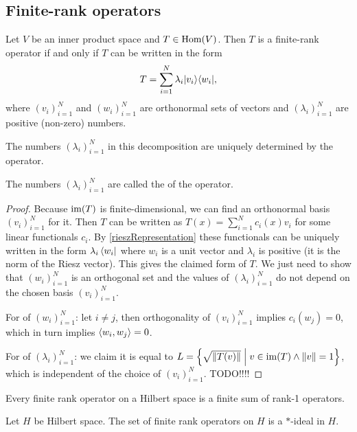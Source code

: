 \subsection{Finite-rank operators}
\begin{proposition} \label{finiteRankSingularValues}
Let $V$ be an inner product space and $T\in\operatorname{Hom}(V)$. Then $T$ is a finite-rank operator \textup{if and only if} $T$ can be written in the form
\[ T = \sum_{i=1}^N \lambda_i |v_i\rangle\langle w_i|, \]
where $(v_i)_{i=1}^N$ and $(w_i)_{i=1}^N$ are orthonormal sets of vectors and $(\lambda_i)_{i=1}^N$ are positive (non-zero) numbers.

The numbers $(\lambda_i)_{i=1}^N$ in this decomposition are uniquely determined by the operator.
\end{proposition}
The numbers $(\lambda_i)_{i=1}^N$ are called the  of the operator.
\begin{proof}
Because $\operatorname{im}(T)$ is finite-dimensional, we can find an orthonormal basis $(v_i)_{i=1}^N$ for it. Then $T$ can be written as $T(x) = \sum_{i=1}^N c_i(x)v_i$ for some linear functionals $c_i$. By \ref{rieszRepresentation} these functionals can be uniquely written in the form $\lambda_i\left\langle w_i \right|$ where $w_i$ is a unit vector and $\lambda_i$ is positive (it is the norm of the Riesz vector). This gives the claimed form of $T$. We just need to show that $(w_i)_{i=1}^N$ is an orthogonal set and the values of $(\lambda_i)_{i=1}^N$ do not depend on the chosen basis $(v_i)_{i=1}^N$.

For  of $(w_i)_{i=1}^N$: let $i\neq j$, then orthogonality of $(v_i)_{i=1}^N$ implies $c_i(w_j) = 0$, which in turn implies $\left\langle w_i,w_j \right\rangle = 0$.

For  of $(\lambda_i)_{i=1}^N$: we claim it is equal to $L = \left\{ \sqrt{\lVert T(v)\rVert} \;\middle|\; v\in\operatorname{im}(T)\land\lVert v\rVert=1 \right\}$, which is independent of the choice of $(v_i)_{i=1}^N$. TODO!!!!
\end{proof}
\begin{corollary}
Every finite rank operator on a Hilbert space is a finite sum of rank-1 operators.
\end{corollary}

\begin{lemma}
Let $H$ be Hilbert space. The set of finite rank operators on $H$ is a $*$-ideal in $H$.
\end{lemma}

